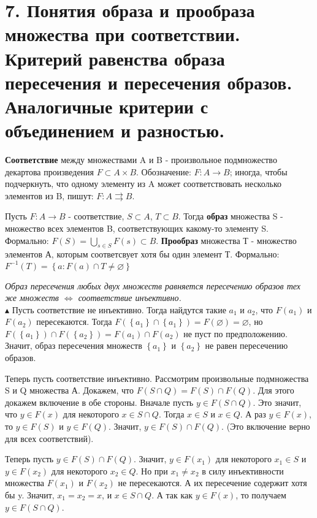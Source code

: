 \section*{7. Понятия образа и прообраза множества при соответствии. Критерий равенства образа пересечения и пересечения образов. Аналогичные критерии с объединением и разностью.} 
\textbf{Соответствие} между множествами A и B - произвольное подмножество декартова произведения $F \subset A \times B$. Обозначение: $F: A \to B$; иногда, чтобы подчеркнуть, что одному элементу из A может соответствовать несколько элементов из B, пишут: $F:A\rightrightarrows B$. 
\\
\par
Пусть $F: A \to B$ - соответствие, $S \subset A$, $T \subset B$. Тогда \textbf{образ} множества S - множество всех элементов B, соответствующих какому-то элементу S. Формально: $F(S) = \bigcup_{s \in S} F(s) \subset B $. \textbf{Прообраз} множества Т - множество элементов А, которым соответсвует хотя бы один элемент Т. Формально: $F^{-1}(T) = \left\{ a: F(a) \cap T \neq \varnothing \right\}$ 
\\
\par
\emph{ Образ пересечения любых двух множеств равняется пересечению образов тех же множеств $\iff$ соответствие инъективно. } 
\\
$\blacktriangle$
Пусть соответствие не инъективно. Тогда найдутся такие $a_1$ и $a_2$, что $F(a_1)$ и $F(a_2)$ пересекаются. Тогда $F(\left\{a_1\right\} \cap \left\{a_1\right\}) = F(\varnothing) = \varnothing$, но $F(\left\{a_1\right\}) \cap F(\left\{a_2\right\}) = F(a_1) \cap F(a_2)$ не пуст по предположению. Значит, образ пересечения множеств $\left\{ a_1\right\}$ и $\left\{ a_2\right\}$ не равен пересечению образов. \par
Теперь пусть соответствие инъективно. Рассмотрим произвольные подмножества S и Q множества А. Докажем, что $F(S \cap Q) = F(S) \cap F(Q)$. Для этого докажем включение в обе стороны. Вначале пусть $y \in F(S \cap Q)$. Это значит, что $y \in F(x)$ для некоторого $x \in S \cap Q$. Тогда $x \in S$ и $x \in Q$. А раз $y \in F(x)$, то $y \in F(S)$ и $y \in F(Q)$. Значит, $y \in F(S) \cap F(Q)$. (Это включение верно для всех соответствий). \par
Теперь пусть $y \in F(S) \cap F(Q)$. Значит, $y \in F(x_1)$ для некоторого $x_1 \in S$ и $y \in F(x_2)$ для некоторого $x_2 \in Q$. Но при $x_1 \neq x_2$ в силу инъективности множества $F(x_1)$ и $F(x_2)$ не пересекаются. А их пересечение содержит хотя бы y. Значит, $x_1 = x_2 = x$, и $x \in S \cap Q$. А так как $y \in F(x)$, то получаем $y \in F(S \cap Q)$.
